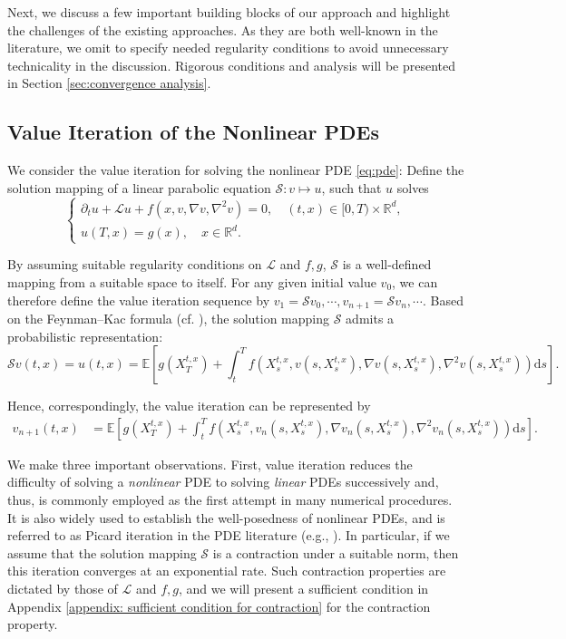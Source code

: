 \documentclass[twoside,11pt]{article}
\newcommand{\dd}{\mathrm{d}}
\newcommand{\E}{\mathbb{E}}
\newcommand{\R}{\mathbb{R}}
\newcommand{\Lc}{\mathcal{L}}
\newcommand{\1}{\mathbf{1}}
\numberwithin{equation}{section}
\begin{document}
Next, we discuss a few important building blocks of our approach and highlight the challenges of the existing approaches. As they are both well-known in the literature, we  omit to specify needed regularity conditions to avoid unnecessary technicality in the discussion. Rigorous conditions and analysis will be presented in Section \ref{sec:convergence analysis}.
\subsection{Value Iteration of the Nonlinear PDEs}
We consider the value iteration for solving the nonlinear PDE \eqref{eq:pde}: Define the solution mapping of a linear parabolic equation $\mathcal S: v \mapsto u$, such that $u$ solves
\begin{equation}\label{eq:pde linearize 0}
    \begin{cases}
\partial_t u + \Lc u +  f( x,v, \nabla v, \nabla^2 v) = 0, \quad (t,x) \in [0,T)\times\R^d, \\
u(T,x) = g(x), \quad x \in \R^d.
\end{cases}
\end{equation}

By assuming suitable regularity conditions on $\mathcal L$ and $f,g$, $\mathcal S$ is a well-defined mapping from a suitable space to itself. For any given initial value $v_0$, we can therefore define the value iteration sequence by $v_1 = \mathcal S v_0,\cdots,v_{n+1} = \mathcal S v_n,\cdots$. Based on the Feynman--Kac formula (cf. \citealt{karatzas2014brownian}), the solution mapping $\mathcal S$ admits a probabilistic representation:
\begin{equation}\label{eq:feymann-kac}
\mathcal S v(t,x) =     u(t,x) =  \E\left[ g(X_T^{t,x}) + \int_t^T f\left(  X_s^{t,x},v(s,X_s^{t,x}),\nabla v(s,X_s^{t,x}),\nabla^2 v(s,X_s^{t,x}) \right)\dd s\right] .
\end{equation}

Hence, correspondingly, the value iteration can be represented by
\begin{equation} \label{eq:iter_fk}
\begin{aligned}
    v_{n+1}(t,x) &= \E\left[ g(X_T^{t,x}) + \int_t^T f\left(  X_s^{t,x},v_n(s,X_s^{t,x}),\nabla v_n(s,X_s^{t,x}),\nabla^2 v_n(s,X_s^{t,x}) \right)\dd s\right].
    \end{aligned}
\end{equation}

We make three important observations. First, value iteration reduces the difficulty of solving a {\it nonlinear} PDE to solving {\it linear} PDEs successively and, thus, is commonly employed as the first attempt in many numerical procedures. It is also widely used to establish the well-posedness of nonlinear PDEs, and is referred to as Picard iteration in the PDE literature (e.g., \citealt{han26}). In particular, if we assume that the solution mapping $\mathcal S$ is a contraction under a suitable norm, then this iteration converges at an exponential rate. Such contraction properties are dictated by those of $\mathcal L$ and $f,g$, and we will present a sufficient condition in Appendix \ref{appendix: sufficient condition for contraction} for the contraction property.
\end{document}
